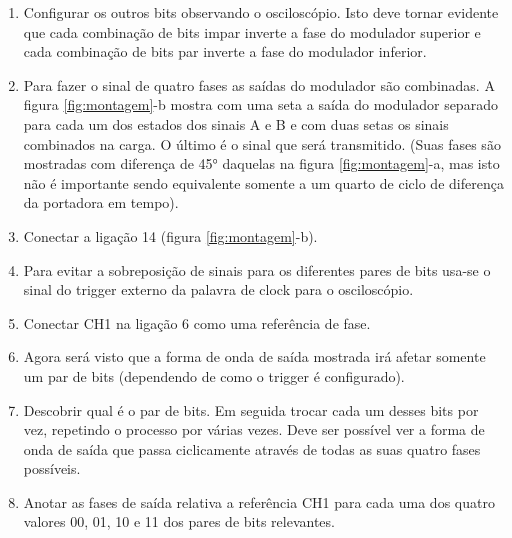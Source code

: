 \begin{enumerate}
                \item Configurar os outros bits observando o osciloscópio. Isto deve tornar evidente que cada combinação de bits impar inverte a fase do modulador superior e cada combinação de bits par inverte a fase do modulador inferior.
                
                \item Para fazer o sinal de quatro fases as saídas do modulador são combinadas. A figura \ref{fig:montagem}-b mostra com uma seta a saída do modulador separado para cada um dos estados dos sinais A e B e com duas setas os sinais combinados na carga. O último é o sinal que será transmitido. (Suas fases são mostradas com diferença de 45° daquelas na figura \ref{fig:montagem}-a, mas isto não é importante sendo equivalente somente a um quarto de ciclo de diferença da portadora em tempo).
                
                \item Conectar a ligação 14 (figura \ref{fig:montagem}-b).
                
                \item Para evitar a sobreposição de sinais para os diferentes pares de bits usa-se o sinal do trigger externo da palavra de clock para o osciloscópio.
                
                \item Conectar CH1 na ligação 6 como uma referência de fase.
                
                \item Agora será visto que a forma de onda de saída mostrada irá afetar somente um par de bits (dependendo de como o trigger é configurado).
                
                \item Descobrir qual é o par de bits. Em seguida trocar cada um desses bits por vez, repetindo o processo por várias vezes. Deve ser possível ver a forma de onda de saída que passa ciclicamente através de todas as suas quatro fases possíveis.
                
                \item Anotar as fases de saída relativa a referência CH1 para cada uma dos quatro valores 00, 01, 10 e 11 dos pares de bits relevantes.

            \end{enumerate}